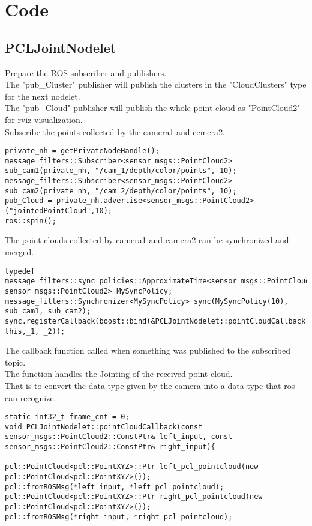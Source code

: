 \chapter{Code}
\section{PCLJointNodelet}
Prepare the ROS subscriber and publishers.\\	
The "pub\_Cluster" publisher will publish the clusters in the "CloudClusters" type for the next nodelet.\\
The "pub\_Cloud" publisher will publish the whole point cloud as "PointCloud2" for rviz visualization.\\
Subscribe the points collected by the camera1 and cemera2.\\

\begin{lstlisting}
private_nh = getPrivateNodeHandle();
message_filters::Subscriber<sensor_msgs::PointCloud2> sub_cam1(private_nh, "/cam_1/depth/color/points", 10);
message_filters::Subscriber<sensor_msgs::PointCloud2> sub_cam2(private_nh, "/cam_2/depth/color/points", 10);
pub_Cloud = private_nh.advertise<sensor_msgs::PointCloud2>("jointedPointCloud",10);
ros::spin();
\end{lstlisting}
The point clouds collected by camera1 and camera2 can be synchronized and merged.\\
\begin{lstlisting}
typedef message_filters::sync_policies::ApproximateTime<sensor_msgs::PointCloud2, sensor_msgs::PointCloud2> MySyncPolicy;
message_filters::Synchronizer<MySyncPolicy> sync(MySyncPolicy(10), sub_cam1, sub_cam2);
sync.registerCallback(boost::bind(&PCLJointNodelet::pointCloudCallback, this,_1, _2));
\end{lstlisting}

The callback function called when something was published to the subscribed topic.\\
The function handles the Jointing of the received point cloud.\\
That is to convert the data type given by the camera into a data type that ros can recognize.\\
\begin{lstlisting}[caption={}]
static int32_t frame_cnt = 0;
void PCLJointNodelet::pointCloudCallback(const sensor_msgs::PointCloud2::ConstPtr& left_input, const sensor_msgs::PointCloud2::ConstPtr& right_input){
		
pcl::PointCloud<pcl::PointXYZ>::Ptr left_pcl_pointcloud(new pcl::PointCloud<pcl::PointXYZ>());
pcl::fromROSMsg(*left_input, *left_pcl_pointcloud);
pcl::PointCloud<pcl::PointXYZ>::Ptr right_pcl_pointcloud(new pcl::PointCloud<pcl::PointXYZ>());
pcl::fromROSMsg(*right_input, *right_pcl_pointcloud);
\end{lstlisting}
	
